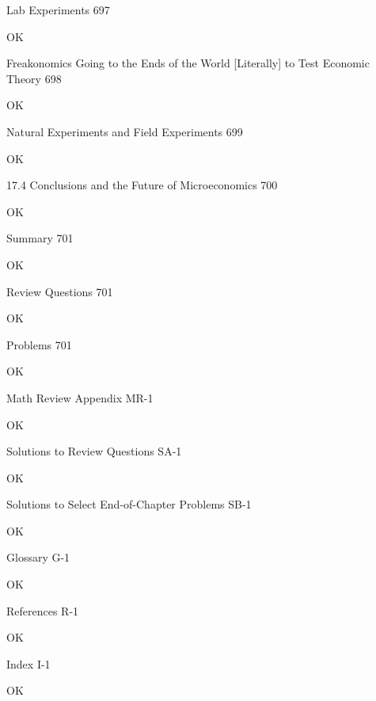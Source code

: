 Lab Experiments 697

OK

Freakonomics Going to the Ends of the World [Literally] to Test Economic Theory 698

OK

Natural Experiments and Field Experiments 699

OK

17.4 Conclusions and the Future of Microeconomics 700

OK

Summary 701

OK

Review Questions 701

OK

Problems 701

OK

Math Review Appendix MR-1

OK

Solutions to Review Questions SA-1

OK

Solutions to Select End-of-Chapter Problems SB-1

OK

Glossary G-1

OK

References R-1

OK

Index I-1

OK
